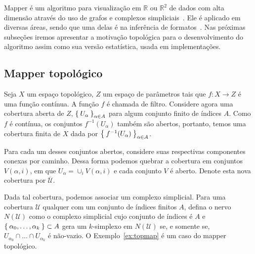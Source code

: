 Mapper é um algoritmo para visualização em $\mathbb{R}$ ou $\mathbb{R}^2$ de dados com alta dimensão 
através do uso de grafos e complexos simpliciais~\cite{mapper}. Ele é aplicado em diversas áreas,
sendo que uma delas é na inferência de formatos~\cite{Lum2013}. Nas próximas subseções iremos apresentar
a motivação topológica para o desenvolvimento do algoritmo assim como sua versão estatística, usada
em implementações. 

\subsection{Mapper topológico}

Seja $X$ um espaço topológico, $Z$ um espaço de parâmetros tais que $f \colon X \to Z$ é uma
função contínua. A função $f$ é chamada de filtro. Considere agora uma cobertura aberta
de $Z$, $\Set{U_\alpha}_{\alpha \in A}$ para algum conjunto finito de índices $A$. Como
$f$ é contínua, os conjuntos $f^{-1}(U_\alpha)$ também são abertos, portanto, temos uma
cobertura finita de $X$ dada por $\Set{f^{-1}(U_\alpha)}_{\alpha  \in A}$. 

Para cada um desses conjuntos abertos, considere suas respectivas componentes
conexas por caminho. Dessa forma podemos quebrar a cobertura em conjuntos $V(\alpha, i)$, 
em que $U_\alpha = \cup_i V(\alpha,i)$ e cada conjunto $V$ é aberto. Denote esta nova
cobertura por $\overline{\mathcal{U}}$.

Dada tal cobertura, podemos associar um complexo simplicial. Para uma cobertura $\mathcal{U}$
qualquer com um conjunto de índices finitos $A$, defina o nervo $N(\mathcal{U})$ como o 
complexo simplicial cujo conjunto de índices é $A$ e $\Set{\alpha_0, \dots, \alpha_k} \subset A$ 
gera um $k$-simplexo em $N(\mathcal{U})$ se, e somente se, $U_{\alpha_0} \cap \dots \cap U_{\alpha_k}$
é não-vazio. O Exemplo~\ref{ex:topmap} é um caso do mapper topológico.


